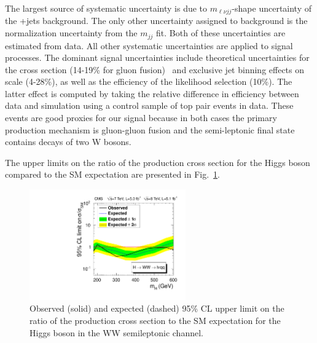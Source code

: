 The largest source of systematic
uncertainty is due to $m_{\ell\nu jj}$-shape uncertainty of the \PW+jets background.
The only other
uncertainty assigned to background is the normalization uncertainty
from the $m_{jj}$ fit. Both of these uncertainties are
estimated from data. All other systematic uncertainties are applied to
signal processes. The dominant signal uncertainties include
theoretical uncertainties for the cross section (14-19\% for gluon
fusion)~\cite{LHCHiggsCrossSectionWorkingGroup:2011ti} and exclusive
jet binning effects on scale (4-28\%), as well as the efficiency of
the likelihood selection (10\%). The latter effect is computed by
taking the relative difference in efficiency between data and
simulation using a control sample of top pair events in data. These
events are good proxies for our signal because in both cases the
primary production mechanism is gluon-gluon fusion and the
semi-leptonic final state contains decays of two W bosons.

The upper limits on the ratio of the production cross section for the
Higgs boson compared to the SM expectation are presented in
Fig.~\ref{fig:hwwlvjjlim}. 

\begin{figure}[htbp]
  \centering
  \includegraphics[width=0.6\textwidth]{figures/WW2l2qLimit.pdf}
  \caption{\label{fig:hwwlvjjlim}Observed (solid) and expected
  (dashed) 95\% CL upper limit on the ratio of the production cross
  section to the SM expectation for the Higgs boson in the WW
  semileptonic channel.}  
\end{figure}
